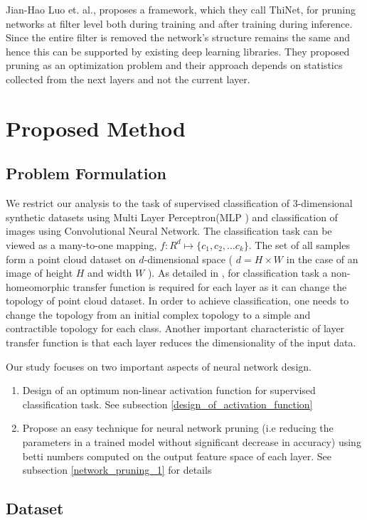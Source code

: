 \documentclass{bmvc2k}
\begin{document}
Jian-Hao Luo et. al.\cite{Luo_2017_ICCV}, proposes a framework, which they call ThiNet, for pruning networks at filter level both during training and after training during  inference.
Since the entire filter is removed the network's structure remains the same and hence this can be supported by existing deep learning libraries.
They proposed pruning as an optimization problem and their approach depends on statistics collected from the next layers and not the current layer.


\section{Proposed Method}

\subsection{Problem Formulation}
We restrict our analysis to the task of supervised classification of  3-dimensional synthetic datasets using Multi Layer Perceptron(MLP ) and classification of images using Convolutional Neural Network.
The classification task can be viewed as a many-to-one mapping, $f:R^d \mapsto \{c_1, c_2, \ldots c_k\}$.
The set of all samples  form a point cloud dataset on $d$-dimensional space ( $d=H \times W $  in the case of an image of height $H$  and width $W$ ).
As detailed in \cite{naitzat2020topology},  for classification task a non-homeomorphic transfer function is required for each layer as it can change the topology of point cloud dataset.
In order to achieve classification, one needs to change the topology from an initial complex topology to a simple and contractible topology for each class.
Another important characteristic of layer transfer function is that each layer reduces the dimensionality of the input data.

Our study focuses on two important aspects of neural network design.
\begin{enumerate}
\item Design of an optimum non-linear activation function for supervised classification task. See subsection \ref{design_of_activation_function}
\item Propose an easy technique for neural network pruning (i.e reducing the parameters in a trained model without significant decrease in accuracy) using betti numbers computed on the output feature space of each layer. See subsection \ref{network_pruning_1} for details
\end{enumerate}
\subsection{Dataset}
\end{document}
